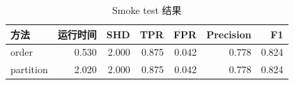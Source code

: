 \begin{table}[H]
\centering
\small
\setlength{\tabcolsep}{2pt}
\caption{Smoke test 结果}
\label{tab:smoke}
\begin{tabular}{lrrrrrr}
\toprule
方法 & 运行时间 & SHD & TPR & FPR & Precision & F1
\\
\midrule
order & 0.530 & 2.000 & 0.875 & 0.042 & 0.778 & 0.824 \\
partition & 2.020 & 2.000 & 0.875 & 0.042 & 0.778 & 0.824 \\
\bottomrule
\end{tabular}
\end{table}
